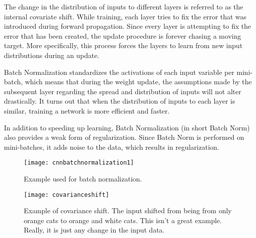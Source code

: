 \begin{bulletedlist}
		\item The change in the distribution of inputs to different layers is referred to as the internal covariate shift. While training, each layer tries to fix the error that was introduced during forward propagation. Since every layer is attempting to fix the error that has been created, the update procedure is forever chasing a moving target. More specifically, this process forces the layers to
learn from new input distributions during an update.
		\item Batch Normalization standardizes the activations of each input variable per mini-batch, which means that during the weight update, the assumptions made by the subsequent layer regarding the spread and distribution of inputs will not alter drastically. It turns out that when the distribution of inputs to each layer is similar, training a network is more efficient and faster.
		\item In addition to speeding up learning, Batch Normalization (in short Batch Norm) also provides a weak form of regularization. Since Batch Norm is performed on mini-batches, it adds noise to the data, which results in regularization.
	\end{bulletedlist}

	\begin{figure}[tbh]
		\centering
		\texttt{[image: cnnbatchnormalization1]}
		\caption[Example used for batch normalization]{Example used for batch normalization.}
		\label{fig:cnnbatchnormalization1}
	\end{figure}

	\begin{figure}[tbh]
		\centering
		\texttt{[image: covarianceshift]}
		\caption[Example of covariance shift]{Example of covariance shift.  The input shifted from being from only orange cats to orange and white cats.  This isn't a great example.  Really, it is just any change in the input data.}
		\label{fig:covarianceshift}
	\end{figure}

